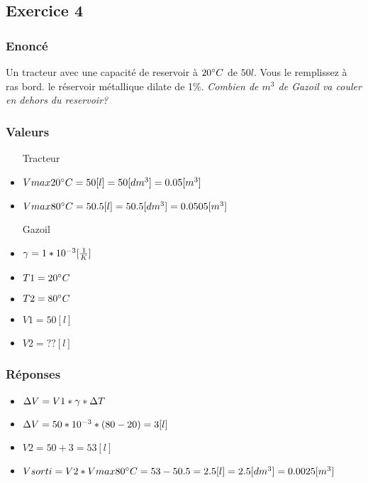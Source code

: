 
\subsection{Exercice 4}
\subsubsection{Enoncé}
Un tracteur avec une capacité de reservoir à $20\celsius$ de $50l$. Vous le remplissez à ras bord.
le réservoir métallique dilate de 1\%.
\textit{Combien de $m^3$ de Gazoil va couler en dehors du reservoir?}
\subsubsection{Valeurs}
\begin{itemize}
    \item[Tracteur]
    \item $Vmax20\celsius = 50[l] = 50[dm^3] = 0.05[m^3]$
    \item $Vmax80\celsius = 50.5[l] = 50.5[dm^3] = 0.0505[m^3]$ 
    \item[Gazoil] 
    \item $\gamma = 1*10^{-3}[\dila]$
    \item $T1 = 20\celsius$
    \item $T2 = 80\celsius$
    \item $V1 = 50[l]$
    \item $V2 = ??[l]$ 
\end{itemize}

\subsubsection{Réponses}
\begin{itemize} 
    \item $\dV = V1 * \gamma * \dT$
    \item $\dV = 50 * 10^{-3} * (80 - 20) = 3[l]$
    \item $V2 = 50 + 3 = 53[l]$
    \item $Vsorti = V2 * Vmax80\celsius = 53 - 50.5 = 2.5[l] = 2.5[dm^3] = 0.0025[m^3]$
\end{itemize}
